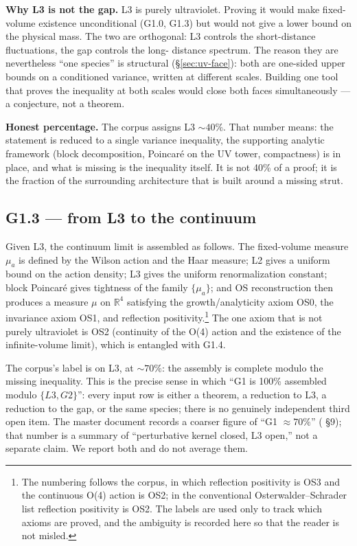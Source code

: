 \textbf{Why L3 is not the gap.} L3 is purely ultraviolet. Proving it would make fixed-volume
existence unconditional (G1.0, G1.3) but would not give a lower bound on the physical mass. The
two are orthogonal: L3 controls the short-distance fluctuations, the gap controls the long-
distance spectrum. The reason they are nevertheless ``one species'' is structural
(\S\ref{sec:uv-face}): both are one-sided upper bounds on a conditioned variance, written at
different scales. Building one tool that proves the inequality at both scales would close both
faces simultaneously --- a conjecture, not a theorem.

\textbf{Honest percentage.} The corpus assigns L3 $\sim40\%$. That number means: the statement is
reduced to a single variance inequality, the supporting analytic framework (block decomposition,
Poincar\'e on the UV tower, compactness) is in place, and what is missing is the inequality
itself. It is not 40\% of a proof; it is the fraction of the surrounding architecture that is
built around a missing strut.

\subsection{G1.3 --- from L3 to the continuum}

Given L3, the continuum limit is assembled as follows. The fixed-volume measure $\mu_a$ is
defined by the Wilson action and the Haar measure; L2 gives a uniform bound on the action
density; L3 gives the uniform renormalization constant; block Poincar\'e gives tightness of the
family $\{\mu_a\}$; and OS reconstruction then produces a measure $\mu$ on $\mathbb{R}^4$
satisfying the growth/analyticity axiom OS0, the invariance axiom OS1, and reflection
positivity.\footnote{The numbering follows the corpus, in which reflection positivity is OS3 and
the continuous O(4) action is OS2; in the conventional Osterwalder--Schrader list reflection
positivity is OS2. The labels are used only to track which axioms are proved, and the ambiguity
is recorded here so that the reader is not misled.} The one axiom that is not purely ultraviolet
is OS2 (continuity of the O(4) action and the existence of the infinite-volume limit), which is
entangled with G1.4.

The corpus's label is \LC{} on L3, at $\sim70\%$: the assembly is complete modulo the missing
inequality. This is the precise sense in which ``G1 is 100\% assembled modulo $\{L3,G2\}$'':
every input row is either a theorem, a reduction to L3, a reduction to the gap, or the same
species; there is no genuinely independent third open item. The master document records a
coarser figure of ``G1 $\approx70\%$'' ( \S9); that number is a
summary of ``perturbative kernel closed, L3 open,'' not a separate claim. We report both and do
not average them.

